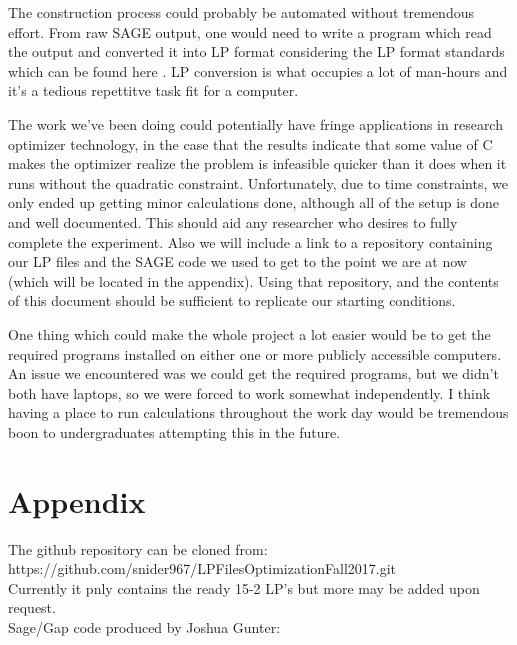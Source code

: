 \documentclass[11pt]{article} %
\theoremstyle{definition}
\theoremstyle{remark}
\begin{document}
The construction process could probably be automated without tremendous effort. From raw SAGE output, one would need to write a program which read the output and converted it into LP format considering the LP format standards which can be found here \cite{some}. LP conversion is what occupies a lot of man-hours and it's a tedious repettitve task fit for a computer.

The work we've been doing could potentially have fringe applications in research optimizer technology, in the case that the results indicate that some value of C makes the optimizer realize the problem is infeasible quicker than it does when it runs without the quadratic constraint. Unfortunately, due to time constraints, we only ended up getting minor calculations done, although all of the setup is done and well documented. This should aid any researcher who desires to fully complete the experiment. Also we will include a link to a repository containing our LP files and the SAGE code we used to get to the point we are at now (which will be located in the appendix). Using that repository, and the contents of this document should be sufficient to replicate our starting conditions. 

One thing which could make the whole project a lot easier would be to get the required programs installed on either one or more publicly accessible computers. An issue we encountered was we could get the required programs, but we didn't both have laptops, so we were forced to work somewhat independently. I think having a place to run calculations throughout the work day would be tremendous boon to undergraduates attempting this in the future.

\section{Appendix}

The github repository can be cloned from:\\
https://github.com/snider967/LPFilesOptimizationFall2017.git\\
Currently it pnly contains the ready 15-2 LP's but more may be added upon request.\\
Sage/Gap code produced by Joshua Gunter:
\end{document}
